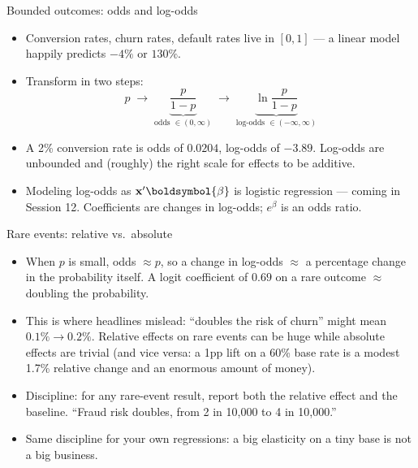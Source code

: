 \documentclass[aspectratio=169,11pt]{beamer}
\begin{document}
\begin{frame}{Bounded outcomes: odds and log-odds}
\begin{itemize}
	\item Conversion rates, churn rates, default rates live in $[0,1]$ --- a linear
	model happily predicts $-4\%$ or $130\%$.

	\medskip
	\item Transform in two steps:\[
	p \;\longrightarrow\; \underbrace{\frac{p}{1-p}}_{\text{odds } \in (0,\infty)}
	\;\longrightarrow\; \underbrace{\ln \frac{p}{1-p}}_{\text{log-odds } \in (-\infty,\infty)}
	\]

	\medskip
	\item A 2\% conversion rate is odds of $0.0204$, log-odds of $-3.89$.
	Log-odds are unbounded and (roughly) the right scale for effects to be additive.

	\medskip
	\item Modeling log-odds as ${\bf x}'\boldsymbol{\beta}$ \alert{is} logistic regression --- coming in
	Session 12. Coefficients are changes in log-odds; $e^{\beta}$ is an
	\alert{odds ratio}.
\end{itemize}
\end{frame}


\begin{frame}{Rare events: relative vs.\ absolute}
\begin{itemize}
	\item When $p$ is small, odds $\approx p$, so a change in log-odds
	$\approx$ a \alert{percentage change in the probability itself}. A logit
	coefficient of $0.69$ on a rare outcome $\approx$ doubling the probability.

	\medskip
	\item This is where headlines mislead: ``doubles the risk of churn'' might mean
	$0.1\% \rightarrow 0.2\%$. Relative effects on rare events can be huge while
	absolute effects are trivial (and vice versa: a 1pp lift on a 60\% base rate is a
	modest 1.7\% relative change and an enormous amount of money).

	\medskip
	\item Discipline: for any rare-event result, report \alert{both} the relative
	effect and the baseline. ``Fraud risk doubles, from 2 in 10{,}000 to 4 in
	10{,}000.''

	\medskip
	\item Same discipline for your own regressions: a big elasticity on a tiny base
	is not a big business.
\end{itemize}
\end{frame}
\end{document}
